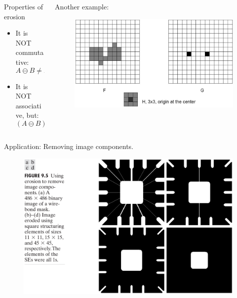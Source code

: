 \begin{frame}
\begin{columns}
\begin{column}{.5\textwidth}
\begin{block}{Properties of erosion}
\begin{itemize}
\item It is NOT commutative:
\[A \ominus B \neq B \ominus A.\]
\item It is NOT associative, but:
\[(A \ominus B)\ominus C \neq A \ominus (B \ominus C).\]
\end{itemize}
\end{block}
\end{column}
\begin{column}{.5\textwidth}
Another example:
\begin{figure}[!h]
\includegraphics[width=\textwidth]{erosion-ex-2}
\end{figure}
\end{column}
\end{columns}
\end{frame}

\begin{frame}
Application: Removing image components.
\begin{figure}[!h]
\includegraphics[width=.8\textwidth]{fig-9-5}
\end{figure}
\end{frame}

